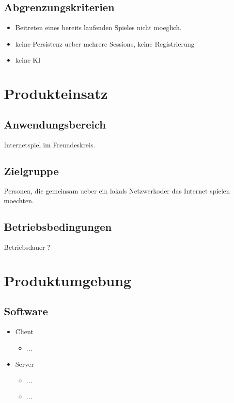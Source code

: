 \documentclass{article}
\begin{document}
\subsection{Abgrenzungskriterien}
\begin{itemize}
	\item Beitreten eines bereits laufenden Spieles nicht moeglich.
	\item keine Persistenz ueber mehrere Sessions, keine Registrierung
	\item keine KI
\end{itemize}

\section{Produkteinsatz}
\subsection{Anwendungsbereich}
Internetspiel im Freundeskreis.
\subsection{Zielgruppe}
Personen, die gemeinsam ueber ein lokals Netzwerkoder das Internet spielen moechten. 
\subsection{Betriebsbedingungen}
Betriebsdauer ?

\section{Produktumgebung}
\subsection{Software}
	\begin{itemize}
		\item Client
		\begin{itemize}
			\item ...
		\end{itemize}
		\item Server
		\begin{itemize}
			\item ...	
			\item ...
		\end{itemize}
	\end{itemize}
\end{document}
